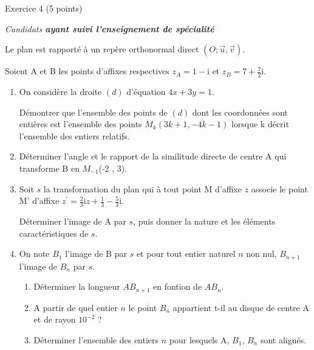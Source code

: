 
%
\begin{h2}Exercice 4 (5 points)\end{h2}
\textit{Candidats \textbf{ayant suivi l'enseignement de spécialité}}
\par
Le plan est rapporté à un repère orthonormal direct $\left(O ; \vec{u} , \vec{v} \right)$.
\par
Soient A et B les points d'affixes respectives $z_{A}=1-\text{i}$ et $z_{B}=7+\frac{7}{2}\text{i}$.
\begin{enumerate}
     \item
     On considère la droite $\left(d\right)$ d'équation $4x+3y=1$.
     \par
     Démontrer que l'ensemble des points de $\left(d\right)$ dont les coordonnées sont entières est l'ensemble des points $M_{k}\left(3k+1 , -4k-1\right)$ lorsque k décrit l'ensemble des entiers relatifs.
     \item
     Déterminer l'angle et le rapport de la similitude directe de centre A qui transforme B en $M_{-1}$(-2 , 3).
     \item
     Soit $s$ la transformation du plan qui à tout point M d'affixe $z$ associe le point M' d'affixe $ z^{\prime}=\frac{2}{3}\text{i}z+\frac{1}{3}-\frac{5}{3}\text{i}$.
     \par
     Déterminer l'image de A par $s$, puis donner la nature et les éléments caractéristiques de $s$.
     \item
     On note $B_{1}$ l'image de B par $s$ et pour tout entier naturel $n$ non nul, $B_{n+1}$ l'image de $B_{n}$ par $s$.
     \begin{enumerate}
          \item
          Déterminer la longueur $AB_{n+1}$ en fontion de $AB_{n}$.
          \item
          A partir de quel entier $n$ le point $B_{n}$ appartient t-il au disque de centre A et de rayon $10^{-2}$ ?
          \item
          Déterminer l'ensemble des entiers $n$ pour lesquels A, $B_{1}$, $B_{n}$ sont alignés.
     \end{enumerate}
\end{enumerate}
